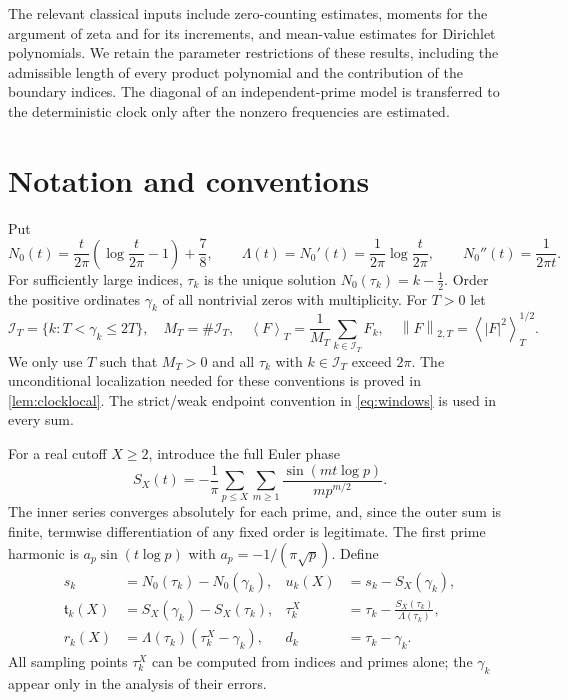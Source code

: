 \documentclass[11pt,reqno]{amsart}
\numberwithin{equation}{section}
\newcommand{\av}[1]{\left\langle #1\right\rangle_T}
\newcommand{\norm}[1]{\left\|#1\right\|_{2,T}}
\newcommand{\calI}{\mathcal I_T}
\newcommand{\lamb}{\Lambda}
\begin{document}
The relevant classical inputs include zero-counting estimates, moments for the argument of zeta and for its increments, and mean-value estimates for Dirichlet polynomials. We retain the parameter restrictions of these results, including the admissible length of every product polynomial and the contribution of the boundary indices. The diagonal of an independent-prime model is transferred to the deterministic clock only after the nonzero frequencies are estimated.


\section{Notation and conventions}\label{sec:notation}
Put
\begin{equation}\label{eq:N0}
N_0(t)=\frac{t}{2\pi}\left(\log\frac{t}{2\pi}-1\right)+\frac78,
\qquad \lamb(t)=N_0'(t)=\frac1{2\pi}\log\frac{t}{2\pi},\qquad
N_0''(t)=\frac1{2\pi t}.
\end{equation}
For sufficiently large indices, $\tau_k$ is the unique solution $N_0(\tau_k)=k-\tfrac12$. Order the positive ordinates $\gamma_k$ of all nontrivial zeros with multiplicity. For $T>0$ let
\begin{equation}\label{eq:windows}
\calI=\{k:T<\gamma_k\le 2T\},\quad M_T=\#\calI,
\quad\av{F}=\frac1{M_T}\sum_{k\in\calI}F_k,\quad \norm{F}=\av{|F|^2}^{1/2}.
\end{equation}
We only use $T$ such that $M_T>0$ and all $\tau_k$ with $k\in\calI$ exceed $2\pi$.  The unconditional localization needed for these conventions is proved in \cref{lem:clocklocal}. The strict/weak endpoint convention in \eqref{eq:windows} is used in every sum.

For a real cutoff $X\ge2$, introduce the full Euler phase
\begin{equation}\label{eq:Sx}
S_X(t)=-\frac1\pi\sum_{p\le X}\sum_{m\ge1}
\frac{\sin(mt\log p)}{m p^{m/2}}.
\end{equation}
The inner series converges absolutely for each prime, and, since the outer sum is finite, termwise differentiation of any fixed order is legitimate. The first prime harmonic is $a_p\sin(t\log p)$ with $a_p=-1/(\pi\sqrt p)$. Define
\begin{equation}\label{eq:defs}
\begin{aligned}
s_k&=N_0(\tau_k)-N_0(\gamma_k),
&u_k(X)&=s_k-S_X(\gamma_k),\\
\mathfrak t_k(X)&=S_X(\gamma_k)-S_X(\tau_k),
&\tau_k^X&=\tau_k-\frac{S_X(\tau_k)}{\lamb(\tau_k)},\\
r_k(X)&=\lamb(\tau_k)(\tau_k^X-\gamma_k),
&d_k&=\tau_k-\gamma_k.
\end{aligned}
\end{equation}
All sampling points $\tau_k^X$ can be computed from indices and primes alone; the $\gamma_k$ appear only in the analysis of their errors.
\end{document}
